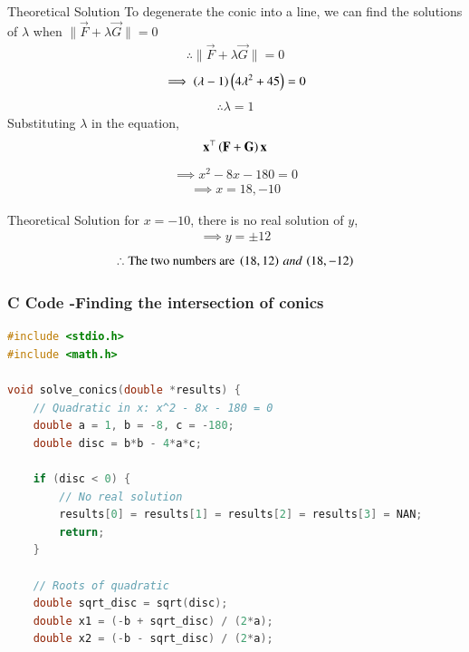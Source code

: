\documentclass{beamer}
\begin{document}
\begin{frame}{Theoretical Solution}
To degenerate the conic into a line, we can find the solutions of $\lambda$ when $\|\vec{F}+\lambda\vec{G}\|=0$
\begin{align}
    \therefore \|\vec{F}+\lambda\vec{G}\|=0
\end{align}
\begin{align}
    \implies \left(\lambda-1\right)\left(4\lambda^2+45\right)=0
\end{align}
\begin{align}
    \therefore \lambda=1
\end{align}
Substituting $\lambda$ in the equation,
\begin{align}
    \mathbf{x}^{\top}\left(\mathbf{F}+\mathbf{G}\right)\mathbf{x}
\end{align}
\begin{align}
    \implies x^2-8x-180=0
\end{align}
\begin{align}
    \implies x=18,-10
\end{align}
\end{frame}

\begin{frame}{Theoretical Solution}
for $x=-10$, there is no real solution of $y$,
\begin{align}
    \implies y=\pm 12
\end{align}
\begin{align}
    \therefore \text{The two numbers are }\left(18,12\right)\, and\, \left(18,-12\right)
\end{align}

\end{frame}

\begin{frame}[fragile]
    \frametitle{C Code -Finding the intersection of conics}

    \begin{lstlisting}[language=C]
#include <stdio.h>
#include <math.h>

void solve_conics(double *results) {
    // Quadratic in x: x^2 - 8x - 180 = 0
    double a = 1, b = -8, c = -180;
    double disc = b*b - 4*a*c;

    if (disc < 0) {
        // No real solution
        results[0] = results[1] = results[2] = results[3] = NAN;
        return;
    }

    // Roots of quadratic
    double sqrt_disc = sqrt(disc);
    double x1 = (-b + sqrt_disc) / (2*a);
    double x2 = (-b - sqrt_disc) / (2*a);


    \end{lstlisting}
\end{frame}
\end{document}
